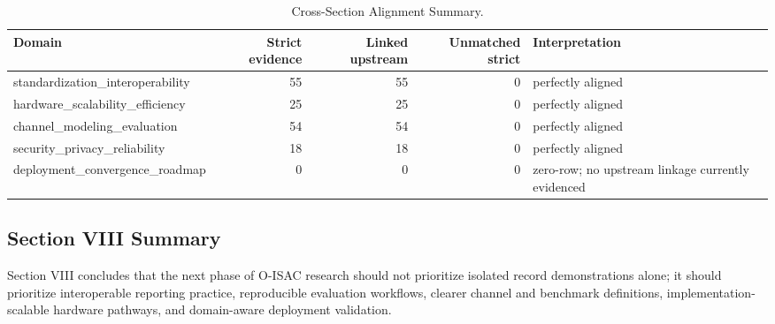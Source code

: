 \begin{table}[!t]
\caption{Cross-Section Alignment Summary.}
\label{tab:alignment}
\centering
\scriptsize
\begin{tabular}{p{} r r r p{}}
\toprule
Domain & Strict evidence & Linked upstream & Unmatched strict & Interpretation \\
\midrule
standardization\_interoperability & 55 & 55 & 0 & perfectly aligned \\
hardware\_scalability\_efficiency & 25 & 25 & 0 & perfectly aligned \\
channel\_modeling\_evaluation & 54 & 54 & 0 & perfectly aligned \\
security\_privacy\_reliability & 18 & 18 & 0 & perfectly aligned \\
deployment\_convergence\_roadmap & 0 & 0 & 0 & zero-row; no upstream linkage currently evidenced \\
\bottomrule
\end{tabular}
\end{table}

\subsection{Section VIII Summary}

Section VIII concludes that the next phase of O-ISAC research should not prioritize isolated record demonstrations alone; it should prioritize interoperable reporting practice, reproducible evaluation workflows, clearer channel and benchmark definitions, implementation-scalable hardware pathways, and domain-aware deployment validation.
